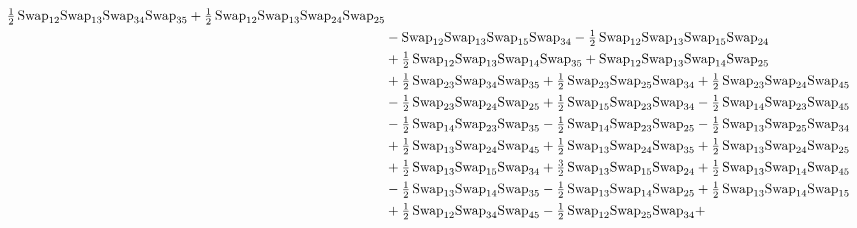 \documentclass[12pt,dvipsnames,accepted=2016-08-18,a4paper,onecolumn]{quantumarticle}
\numberwithin{equation}{section}
\theoremstyle{definition}
\begin{document}
\begin{align*}
        \tfrac12\,\textnormal{Swap}_{12} \textnormal{Swap}_{13} \textnormal{Swap}_{34} \textnormal{Swap}_{35} + \tfrac12\,\textnormal{Swap}_{12} \textnormal{Swap}_{13} \textnormal{Swap}_{24} \textnormal{Swap}_{25}\\ & - \textnormal{Swap}_{12} \textnormal{Swap}_{13} \textnormal{Swap}_{15} \textnormal{Swap}_{34} -
        \tfrac12\,\textnormal{Swap}_{12} \textnormal{Swap}_{13} \textnormal{Swap}_{15} \textnormal{Swap}_{24}\\ & + \tfrac12\,\textnormal{Swap}_{12} \textnormal{Swap}_{13} \textnormal{Swap}_{14} \textnormal{Swap}_{35} + \textnormal{Swap}_{12} \textnormal{Swap}_{13} \textnormal{Swap}_{14} \textnormal{Swap}_{25}\\ & +
        \tfrac12\,\textnormal{Swap}_{23} \textnormal{Swap}_{34} \textnormal{Swap}_{35} + \tfrac12\,\textnormal{Swap}_{23} \textnormal{Swap}_{25} \textnormal{Swap}_{34} + \tfrac12\,\textnormal{Swap}_{23} \textnormal{Swap}_{24} \textnormal{Swap}_{45}\\ & - \tfrac12\,\textnormal{Swap}_{23} \textnormal{Swap}_{24} \textnormal{Swap}_{25} +
        \tfrac12\,\textnormal{Swap}_{15} \textnormal{Swap}_{23} \textnormal{Swap}_{34} - \tfrac12\,\textnormal{Swap}_{14} \textnormal{Swap}_{23} \textnormal{Swap}_{45}\\ & - \tfrac12\,\textnormal{Swap}_{14} \textnormal{Swap}_{23} \textnormal{Swap}_{35} - \tfrac12\,\textnormal{Swap}_{14} \textnormal{Swap}_{23} \textnormal{Swap}_{25} -
        \tfrac12\,\textnormal{Swap}_{13} \textnormal{Swap}_{25} \textnormal{Swap}_{34}\\ & + \tfrac12\,\textnormal{Swap}_{13} \textnormal{Swap}_{24} \textnormal{Swap}_{45} + \tfrac12\,\textnormal{Swap}_{13} \textnormal{Swap}_{24} \textnormal{Swap}_{35} + \tfrac12\,\textnormal{Swap}_{13} \textnormal{Swap}_{24} \textnormal{Swap}_{25}\\ & +
        \tfrac12\,\textnormal{Swap}_{13} \textnormal{Swap}_{15} \textnormal{Swap}_{34} + \tfrac32\,\textnormal{Swap}_{13} \textnormal{Swap}_{15} \textnormal{Swap}_{24} + \tfrac12\,\textnormal{Swap}_{13} \textnormal{Swap}_{14} \textnormal{Swap}_{45}\\ & - \tfrac12\,\textnormal{Swap}_{13} \textnormal{Swap}_{14} \textnormal{Swap}_{35} -
        \tfrac12\,\textnormal{Swap}_{13} \textnormal{Swap}_{14} \textnormal{Swap}_{25} + \tfrac12\,\textnormal{Swap}_{13} \textnormal{Swap}_{14} \textnormal{Swap}_{15}\\ & + \tfrac12\,\textnormal{Swap}_{12} \textnormal{Swap}_{34} \textnormal{Swap}_{45} - \tfrac12\,\textnormal{Swap}_{12} \textnormal{Swap}_{25} \textnormal{Swap}_{34} +

\end{align*}
\end{document}
